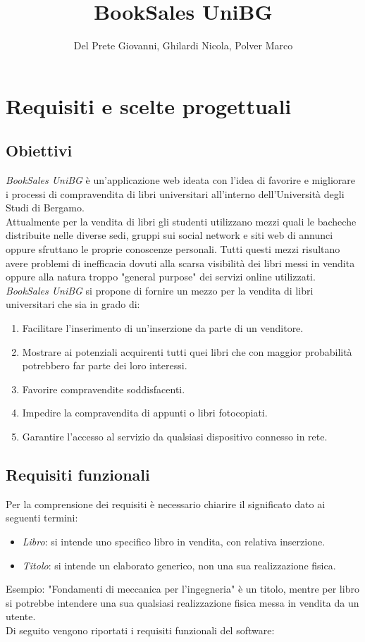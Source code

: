 \documentclass[10pt,a4paper]{book}
\author{Del Prete Giovanni, Ghilardi Nicola, Polver Marco}
\title{BookSales UniBG}
\begin{document}
	
	\maketitle
	\tableofcontents
	
	\section{Requisiti e scelte progettuali}
	\subsection{Obiettivi}
	\textit{BookSales UniBG} è un'applicazione web ideata con l'idea di favorire e migliorare i processi di compravendita di libri universitari all'interno dell'Università degli Studi di Bergamo. 
	\\
	Attualmente per la vendita di libri gli studenti utilizzano mezzi quali le bacheche distribuite nelle diverse sedi, gruppi sui social network e siti web di annunci oppure sfruttano le proprie conoscenze personali. Tutti questi mezzi risultano avere problemi di inefficacia dovuti alla scarsa visibilità dei libri messi in vendita oppure alla natura troppo "general purpose" dei servizi online utilizzati.\\
	\textit{BookSales UniBG} si propone di fornire un mezzo per la vendita di libri universitari che sia in grado di:
	\begin{enumerate}
		\item Facilitare l'inserimento di un'inserzione da parte di un venditore.
		\item Mostrare ai potenziali acquirenti tutti quei libri che con maggior probabilità potrebbero far parte dei loro interessi.
		\item Favorire compravendite soddisfacenti.
		\item Impedire la compravendita di appunti o libri fotocopiati.
		\item Garantire l'accesso al servizio da qualsiasi dispositivo connesso in rete.
	\end{enumerate}

	\subsection{Requisiti funzionali}
	Per la comprensione dei requisiti è necessario chiarire il significato dato ai seguenti termini:
	\begin{itemize}
		\item \textit{Libro}: si intende uno specifico libro in vendita, con relativa inserzione.
		\item \textit{Titolo}: si intende un elaborato generico, non una sua realizzazione fisica.
	\end{itemize}
	Esempio: "Fondamenti di meccanica per l'ingegneria" è un titolo, mentre per libro si potrebbe intendere una sua qualsiasi realizzazione fisica messa in vendita da un utente. \\
	Di seguito vengono riportati i requisiti funzionali del software:\\
	
\end{document}
